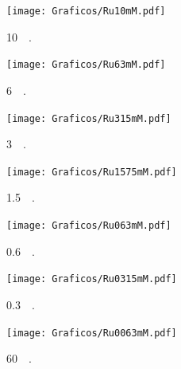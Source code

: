 			\begin{figure}[h!]
			   	    \begin{subfigure}[t]{0.325\textwidth}
			        	\texttt{[image: Graficos/Ru10mM.pdf]}
			        	\vspace*{-0.40cm}\caption{\aminorutenio\space \SI{10}{\milli\Molar}.}
			         	\label{fig:Ru10mM}
			     		\end{subfigure}
			   	    \begin{subfigure}[t]{0.325\textwidth}
			        	\texttt{[image: Graficos/Ru63mM.pdf]}
			       		\vspace*{-0.40cm}\caption{\aminorutenio\space \SI{6}{\milli\Molar}.}
			         	\label{fig:Ru63mM}
			     		\end{subfigure}
		     		\begin{subfigure}[t]{0.325\textwidth}
			        	\texttt{[image: Graficos/Ru315mM.pdf]}
			       		\vspace*{-0.40cm}\caption{\aminorutenio\space \SI{3}{\milli\Molar}.}
			         	\label{fig:Ru315mM}
			     		\end{subfigure}
		     		\begin{subfigure}[t]{0.325\textwidth}
			        	\texttt{[image: Graficos/Ru1575mM.pdf]}
			       		\vspace*{-0.40cm}\caption{\aminorutenio\space \SI{1.5}{\milli\Molar}.}
			         	\label{fig:Ru1575M}
			     		\end{subfigure}
		 	   	   	\begin{subfigure}[t]{0.325\textwidth}
			        	\texttt{[image: Graficos/Ru063mM.pdf]}
			       		\vspace*{-0.40cm}\caption{\aminorutenio\space \SI{0.6}{\milli\Molar}.}
			         	\label{fig:Ru063mM}
			     		\end{subfigure}
		     		\begin{subfigure}[t]{0.325\textwidth}
			        	\texttt{[image: Graficos/Ru0315mM.pdf]}
			       		\vspace*{-0.40cm}\caption{\aminorutenio\space \SI{0.3}{\milli\Molar}.}
			         	\label{fig:Ru0315mM}
			     		\end{subfigure}
			     	 \begin{subfigure}[t]{0.325\textwidth}
			        	\texttt{[image: Graficos/Ru0063mM.pdf]}
			       		\vspace*{-0.40cm}\caption{\aminorutenio\space \SI{60}{\micro\Molar}.}
			         	\label{fig:Ru0063mM}
			     		\end{subfigure}
		     		\begin{subfigure}[t]{0.325\textwidth}

\end{subfigure}
\end{figure}
